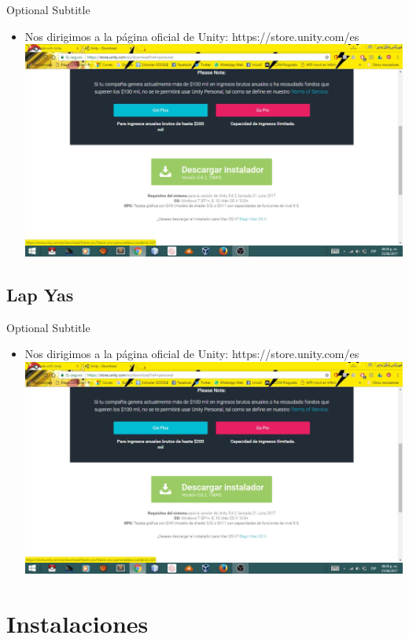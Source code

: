 \documentclass{beamer}
\begin{document}
\begin{frame}{01}{Optional Subtitle}
  \begin{itemize}
  \item {
    Nos dirigimos a la página oficial de Unity:
    https://store.unity.com/es
  }
  \includegraphics[width=\linewidth]{image/IU01}
  \end{itemize}
\end{frame}

\subsection{Lap Yas}

\begin{frame}{01}{Optional Subtitle}
  \begin{itemize}
  \item {
    Nos dirigimos a la página oficial de Unity:
    https://store.unity.com/es
  }
  \includegraphics[width=\linewidth]{image/IU01}
  \end{itemize}
\end{frame}


\section{Instalaciones}
\end{document}
